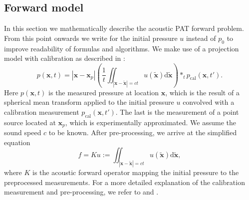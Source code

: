 \documentclass[journal]{IEEEtran}
\begin{document}
\subsection{Forward model}\label{sec:fw_model}
In this section we mathematically describe the acoustic PAT forward problem. From this point onwards we write for the initial pressure $u$ instead of $p_0$ to improve readability of formulas and algorithms. We make use of a projection model with calibration as described in \cite{Wang2004}:
\begin{equation}\label{eq:FW_full}
p(\mathbf{x},t) = |\mathbf{x}-\mathbf{x}_p|\left(\frac{1}{t}\iint_{|\mathbf{x}-\tilde{\mathbf{x}}|=ct} u(\tilde{\mathbf{x}})\text{d} \tilde{\mathbf{x}}\right)\ast_t p_\text{cal}\left(\mathbf{x},t'\right).
\end{equation}
Here $p(\mathbf{x},t)$ is the measured pressure at location $\mathbf{x}$, which is the result of a spherical mean transform \cite{Kruger1995} applied to the initial pressure $u$ convolved with a calibration measurement $p_\text{cal}\left(\mathbf{x},t'\right)$. The last is the measurement of a point source located at $\mathbf{x}_p$, which is experimentally approximated. We assume the sound speed $c$ to be known. After pre-processing, we arrive at the simplified equation 
\begin{equation}\label{eq:FW_prep}
f = Ku:=\iint_{|\mathbf{x}-\tilde{\mathbf{x}}|=ct} u(\tilde{\mathbf{x}})\text{d} \tilde{\mathbf{x}},
\end{equation}
where $K$ is the acoustic forward operator mapping the initial pressure to the preprocessed measurements. For a more detailed explanation of the calibration measurement and pre-processing, we refer to \cite[Chapter 2]{Willemink2010} and \cite{Boink2018}.
\end{document}
